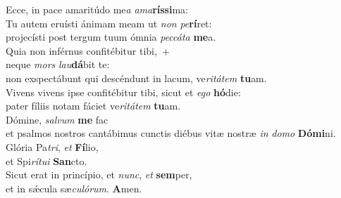 \oddverse Ecce, in pace amaritúdo me\textit{a} \textit{a}\textit{ma}\textbf{rís}\textbf{si}ma:\\
\evenverse Tu autem eruísti ánimam meam ut \textit{non} \textit{pe}\textbf{rí}ret:~\*\\
\evenverse projecísti post tergum tuum ómnia \textit{pec}\textit{cá}\textit{ta} \textbf{me}a.\\
\oddverse Quia non inférnus confitébitur tibi,~+\\
\oddverse  neque \textit{mors} \textit{lau}\textbf{dá}bit te:~\*\\
\oddverse non exspectábunt qui descéndunt in lacum, ve\textit{ri}\textit{tá}\textit{tem} \textbf{tu}am.\\
\evenverse Vivens vivens ipse confitébitur tibi, sicut et \textit{e}\textit{go} \textbf{hó}die:~\*\\
\evenverse pater fíliis notam fáciet ve\textit{ri}\textit{tá}\textit{tem} \textbf{tu}am.\\
\oddverse Dómine, \textit{sal}\textit{vum} \textbf{me} fac~\*\\
\oddverse et psalmos nostros cantábimus cunctis diébus vitæ nostræ \textit{in} \textit{do}\textit{mo} \textbf{Dó}\textbf{mi}ni.\\
\evenverse Glória Pa\textit{tri}, \textit{et} \textbf{Fí}lio,~\*\\
\evenverse et Spi\textit{rí}\textit{tu}\textit{i} \textbf{San}cto.\\
\oddverse Sicut erat in princípio, et \textit{nunc}, \textit{et} \textbf{sem}per,~\*\\
\oddverse et in sǽcula sæ\textit{cu}\textit{ló}\textit{rum}. \textbf{A}men.\\
